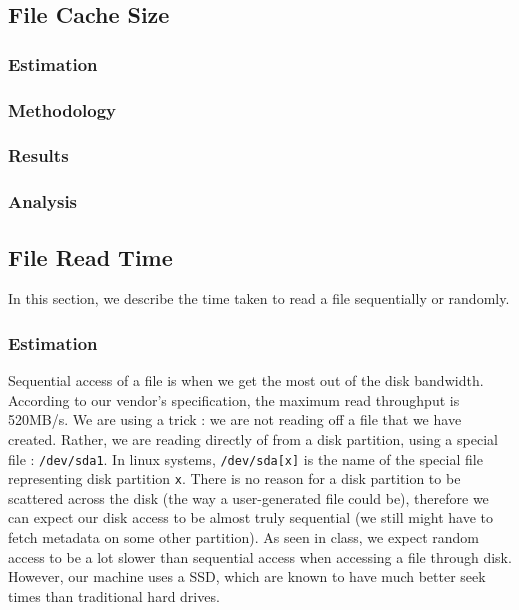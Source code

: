 \subsection{File Cache Size}

\subsubsection{Estimation}

\subsubsection{Methodology}

\subsubsection{Results}

\subsubsection{Analysis}

\subsection{File Read Time}

In this section, we describe the time taken to read a file sequentially or randomly.

\subsubsection{Estimation}

Sequential access of a file is when we get the most out of the disk bandwidth. According to our vendor's specification, the maximum read throughput is 520MB/s. We are using a trick : we are not reading off a file that we have created. Rather, we are reading directly of from a disk partition, using a special file : \texttt{/dev/sda1}. In linux systems, \texttt{/dev/sda[x]} is the name of the special file representing disk partition \texttt{x}. There is no reason for a disk partition to be scattered across the disk (the way a user-generated file could be), therefore we can expect our disk access to be almost truly sequential (we still might have to fetch metadata on some other partition). As seen in class, we expect random access to be a lot slower than sequential access when accessing a file through disk. However, our machine uses a SSD, which are known to have much better seek times than traditional hard drives. 


